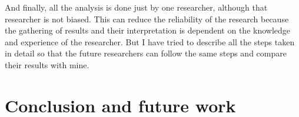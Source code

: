 And finally,  all the analysis is done just by one researcher, although that researcher is not biased. This can reduce the reliability of the research because the gathering of results and their interpretation is dependent on the knowledge and experience of the researcher. But I have tried to describe all the steps taken in detail so that the future researchers can follow the same steps and compare their results with mine.

\chapter{Conclusion and future work}
